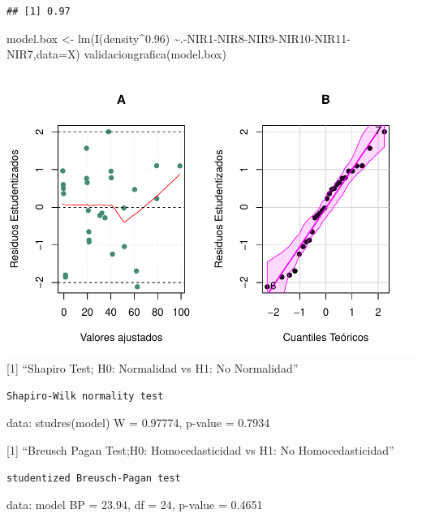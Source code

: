 \documentclass[
]{article}
\newenvironment{Shaded}{\begin{snugshade}}{\end{snugshade}}
\newcommand{\AttributeTok}[1]{\textcolor[rgb]{0.77,0.63,0.00}{#1}}
\newcommand{\FloatTok}[1]{\textcolor[rgb]{0.00,0.00,0.81}{#1}}
\newcommand{\FunctionTok}[1]{\textcolor[rgb]{0.00,0.00,0.00}{#1}}
\newcommand{\NormalTok}[1]{#1}
\newcommand{\OtherTok}[1]{\textcolor[rgb]{0.56,0.35,0.01}{#1}}
\newcommand{\SpecialCharTok}[1]{\textcolor[rgb]{0.00,0.00,0.00}{#1}}
\begin{document}
\begin{verbatim}
## [1] 0.97
\end{verbatim}

\begin{Shaded}
\begin{Highlighting}[]
\NormalTok{model.box }\OtherTok{\textless{}{-}} \FunctionTok{lm}\NormalTok{(}\FunctionTok{I}\NormalTok{(density}\SpecialCharTok{\^{}}\FloatTok{0.96}\NormalTok{) }\SpecialCharTok{\textasciitilde{}}\NormalTok{.}\SpecialCharTok{{-}}\NormalTok{NIR1}\SpecialCharTok{{-}}\NormalTok{NIR8}\SpecialCharTok{{-}}\NormalTok{NIR9}\SpecialCharTok{{-}}\NormalTok{NIR10}\SpecialCharTok{{-}}\NormalTok{NIR11}\SpecialCharTok{{-}}\NormalTok{NIR7,}\AttributeTok{data=}\NormalTok{X)}
\FunctionTok{validaciongrafica}\NormalTok{(model.box)}
\end{Highlighting}
\end{Shaded}

\includegraphics{Taller-2-Regresion-Multiple-Aplicada_files/figure-latex/unnamed-chunk-8-1.pdf}
{[}1{]} ``Shapiro Test; H0: Normalidad vs H1: No Normalidad''

\begin{verbatim}
Shapiro-Wilk normality test
\end{verbatim}

data: studres(model) W = 0.97774, p-value = 0.7934

{[}1{]} ``Breusch Pagan Test;H0: Homocedasticidad vs H1: No
Homocedasticidad''

\begin{verbatim}
studentized Breusch-Pagan test
\end{verbatim}

data: model BP = 23.94, df = 24, p-value = 0.4651
\end{document}
